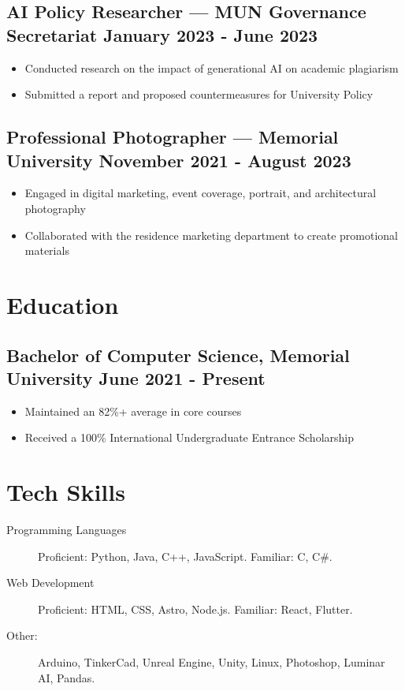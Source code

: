 \documentclass[10pt]{article}
\begin{document}
\subsection{AI Policy Researcher — MUN Governance Secretariat \hfill January 2023 - June 2023}
\begin{itemize}
    \item Conducted research on the impact of generational AI on academic plagiarism
    \item Submitted a report and proposed countermeasures for University Policy
\end{itemize}

\subsection{Professional Photographer — Memorial University \hfill November 2021 - August 2023}
\begin{itemize}
    \item Engaged in digital marketing, event coverage, portrait, and architectural photography
    \item Collaborated with the residence marketing department to create promotional materials
\end{itemize}

\section{Education}
\subsection{Bachelor of Computer Science, Memorial University \hfill June 2021 - Present}
\begin{itemize}
    \item Maintained an 82\%+ average in core courses
    \item Received a 100\% International Undergraduate Entrance Scholarship
\end{itemize}

\section{Tech Skills}
\begin{description}
    \item[Programming Languages] Proficient: Python, Java, C++, JavaScript. Familiar: C, C#.
    \item[Web Development] Proficient: HTML, CSS, Astro, Node.js. Familiar: React, Flutter.
    \item[Other:] Arduino, TinkerCad, Unreal Engine, Unity, Linux, Photoshop, Luminar AI, Pandas.
\end{description}
\end{document}
